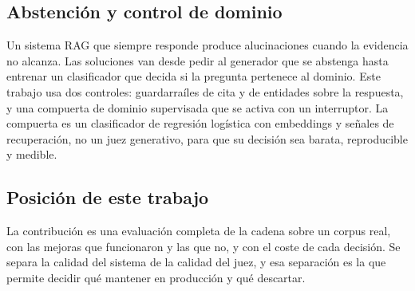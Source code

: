 \subsection{Abstenci\'on y control de dominio}

Un sistema RAG que siempre responde produce alucinaciones cuando la evidencia no alcanza. Las soluciones van desde pedir al generador que se abstenga hasta entrenar un clasificador que decida si la pregunta pertenece al dominio. Este trabajo usa dos controles: guardarra\'iles de cita y de entidades sobre la respuesta, y una compuerta de dominio supervisada que se activa con un interruptor. La compuerta es un clasificador de regresi\'on log\'istica con embeddings y se\~nales de recuperaci\'on, no un juez generativo, para que su decisi\'on sea barata, reproducible y medible.

\subsection{Posici\'on de este trabajo}

La contribuci\'on es una evaluaci\'on completa de la cadena sobre un corpus real, con las mejoras que funcionaron y las que no, y con el coste de cada decisi\'on. Se separa la calidad del sistema de la calidad del juez, y esa separaci\'on es la que permite decidir qu\'e mantener en producci\'on y qu\'e descartar.
